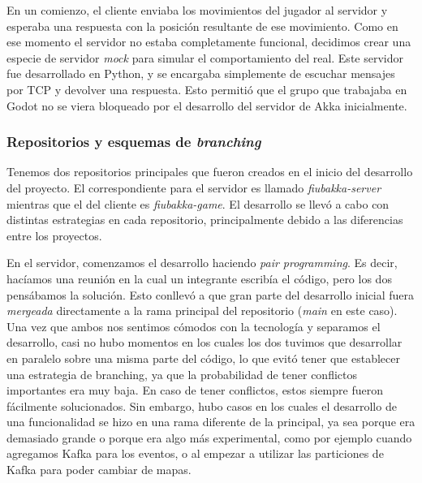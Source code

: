 En un comienzo, el cliente enviaba los movimientos del jugador al servidor y esperaba una respuesta con la
posición resultante de ese movimiento. Como en ese momento el servidor no estaba completamente funcional, decidimos crear una especie de servidor
\textit{mock} para simular el comportamiento del real. Este servidor fue desarrollado en Python, y se encargaba simplemente de escuchar mensajes por TCP
y devolver una respuesta. Esto permitió que el grupo que trabajaba en Godot no se viera bloqueado por el desarrollo del servidor de Akka inicialmente.

\subsubsection{Repositorios y esquemas de \textit{branching}}

\noindent Tenemos dos repositorios principales que fueron creados en el inicio del desarrollo del proyecto.
El correspondiente para el servidor es llamado \textit{fiubakka-server} mientras que el del cliente es \textit{fiubakka-game}.
El desarrollo se llevó a cabo con distintas estrategias en cada repositorio, principalmente debido a las diferencias entre los proyectos.

En el servidor, comenzamos el desarrollo haciendo \textit{pair programming}. Es decir, hacíamos una reunión en la cual un integrante
escribía el código, pero los dos pensábamos la solución. Esto conllevó a que gran parte del desarrollo inicial fuera \textit{mergeada} directamente
a la rama principal del repositorio (\textit{main} en este caso). Una vez que ambos nos sentimos cómodos con la tecnología y separamos el 
desarrollo, casi no hubo momentos en los cuales los dos tuvimos que desarrollar en paralelo sobre una misma parte del código, lo que evitó tener
que establecer una estrategia de branching, ya que la probabilidad de tener conflictos importantes era muy baja. En caso de tener conflictos, 
estos siempre fueron fácilmente solucionados.
Sin embargo, hubo casos en los cuales el desarrollo de una funcionalidad se hizo en una rama diferente de la principal, ya sea porque era demasiado
grande o porque era algo más experimental, como por ejemplo cuando agregamos Kafka para los eventos, o al empezar a utilizar las particiones de Kafka
para poder cambiar de mapas.

